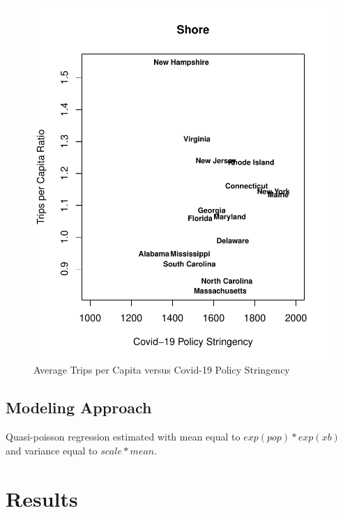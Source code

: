 \documentclass[10pt,letterpaper]{article}
\begin{document}
\begin{figure}

{\centering \includegraphics{C19PolicyRec_files/figure-latex/tripsVstring-3} 

}

\caption{Average Trips per Capita versus Covid-19 Policy Stringency}\label{fig:tripsVstring-3}
\end{figure}

\hypertarget{modeling-approach}{%
\subsection{Modeling Approach}\label{modeling-approach}}

Quasi-poisson regression estimated with mean equal to
\(exp(pop)*exp(xb)\) and variance equal to \(scale*mean\).

\hypertarget{results}{%
\section{Results}\label{results}}
\end{document}
